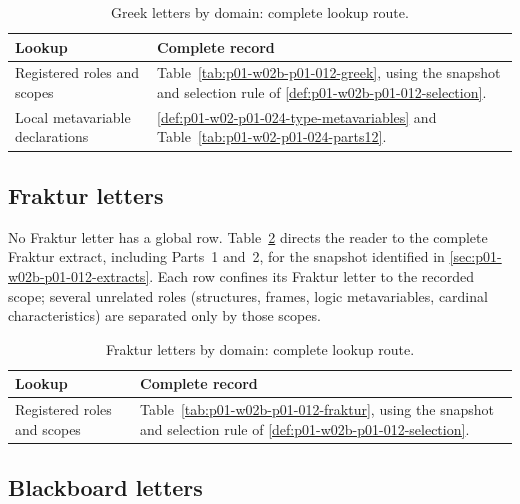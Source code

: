 \begingroup\small
\begin{longtable}{@{}p{}p{}@{}}
\caption{Greek letters by domain: complete lookup route.}
\label{tab:p01-w02-p01-024-greek-domains}\\
\toprule
Lookup & Complete record \\
\midrule
Registered roles and scopes & Table~\ref{tab:p01-w02b-p01-012-greek}, using the snapshot and selection rule of \cref{def:p01-w02b-p01-012-selection}. \\
Local metavariable declarations & \cref{def:p01-w02-p01-024-type-metavariables} and Table~\ref{tab:p01-w02-p01-024-parts12}. \\
\bottomrule
\end{longtable}
\endgroup

\subsection{Fraktur letters}
\label{sec:p01-w02-p01-024-fraktur}

No Fraktur letter has a global row.  Table~\ref{tab:p01-w02-p01-024-fraktur}
directs the reader to the complete Fraktur extract, including Parts~1
and~2, for the snapshot identified in
\cref{sec:p01-w02b-p01-012-extracts}.  Each row confines its Fraktur letter to
the recorded scope; several unrelated roles (structures, frames, logic
metavariables, cardinal characteristics) are separated only by those
scopes.

\begingroup\small
\begin{longtable}{@{}p{}p{}@{}}
\caption{Fraktur letters by domain: complete lookup route.}
\label{tab:p01-w02-p01-024-fraktur}\\
\toprule
Lookup & Complete record \\
\midrule
Registered roles and scopes & Table~\ref{tab:p01-w02b-p01-012-fraktur}, using the snapshot and selection rule of \cref{def:p01-w02b-p01-012-selection}. \\
\bottomrule
\end{longtable}
\endgroup

\subsection{Blackboard letters}
\label{sec:p01-w02-p01-024-blackboard}

